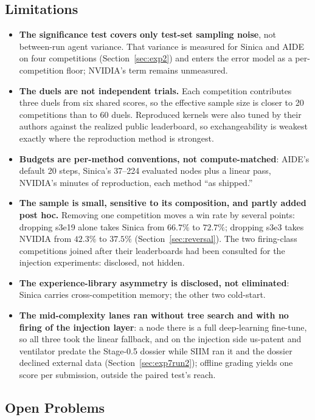 \documentclass[11pt,a4paper]{article}
\begin{document}
\subsection{Limitations}
\label{sec:limitations}

\begin{itemize}[leftmargin=*]
  \item \textbf{The significance test covers only test-set sampling noise}, not between-run agent variance. That variance is measured for Sinica and AIDE on four competitions (Section~\ref{sec:exp2}) and enters the error model as a per-competition floor; NVIDIA's term remains unmeasured.
  \item \textbf{The duels are not independent trials.} Each competition contributes three duels from six shared scores, so the effective sample size is closer to 20 competitions than to 60 duels. Reproduced kernels were also tuned by their authors against the realized public leaderboard, so exchangeability is weakest exactly where the reproduction method is strongest.
  \item \textbf{Budgets are per-method conventions, not compute-matched}: AIDE's default 20 steps, Sinica's 37--224 evaluated nodes plus a linear pass, NVIDIA's minutes of reproduction, each method ``as shipped.''
  \item \textbf{The sample is small, sensitive to its composition, and partly added post hoc.} Removing one competition moves a win rate by several points: dropping s3e19 alone takes Sinica from $66.7\%$ to $72.7\%$; dropping s3e3 takes NVIDIA from $42.3\%$ to $37.5\%$ (Section~\ref{sec:reversal}). The two firing-class competitions joined after their leaderboards had been consulted for the injection experiments: disclosed, not hidden.
  \item \textbf{The experience-library asymmetry is disclosed, not eliminated}: Sinica carries cross-competition memory; the other two cold-start.
  \item \textbf{The mid-complexity lanes ran without tree search and with no firing of the injection layer}: a node there is a full deep-learning fine-tune, so all three took the linear fallback, and on the injection side us-patent and ventilator predate the Stage-0.5 dossier while SIIM ran it and the dossier declined external data (Section~\ref{sec:exp7run2}); offline grading yields one score per submission, outside the paired test's reach.
\end{itemize}

\subsection{Open Problems}
\label{sec:future}
\end{document}
